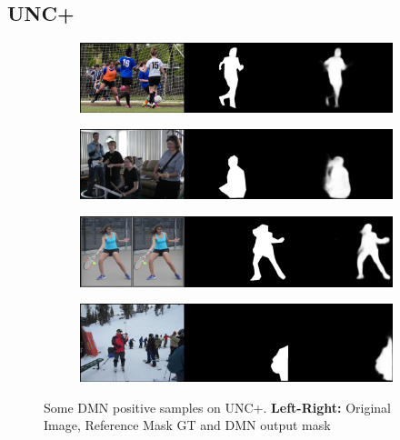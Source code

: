 \subsection*{UNC+}
\begin{figure}[!htbp]
    \centering
    \begin{subfigure}[b]{\columnwidth}
            \centering
            \includegraphics[width=\textwidth]{./figures/unc_plus_samples/5.png}
    \end{subfigure}
    
    \begin{subfigure}[b]{\columnwidth}
            \centering
            \includegraphics[width=\textwidth]{./figures/unc_plus_samples/6.png}
    \end{subfigure}
    
    \begin{subfigure}[b]{\columnwidth}
            \centering
            \includegraphics[width=\textwidth]{./figures/unc_plus_samples/3.png}
    \end{subfigure}
    
    \begin{subfigure}[b]{\columnwidth}
            \centering
            \includegraphics[width=\textwidth]{./figures/unc_plus_samples/4.png}
    \end{subfigure}
    \caption{Some DMN positive samples on UNC+. \textbf{Left-Right:} Original Image, Reference Mask GT and DMN output mask}
    \label{Fig:UNC+_Pos}
\end{figure}
